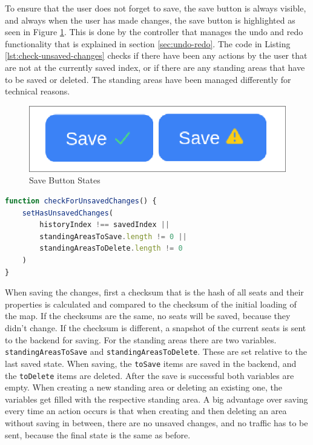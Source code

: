 To ensure that the user does not forget to save, the save button is always visible, and always when the user has made changes, the save button is highlighted as seen in Figure \ref{fig:save-button-states}. This is done by the controller that manages the undo and redo functionality that is explained in section \ref{sec:undo-redo}. The code in Listing \ref{lst:check-unsaved-changes} checks if there have been any actions by the user that are not at the currently saved index, or if there are any standing areas that have to be saved or deleted. The standing areas have been managed differently for technical reasons.

\begin{figure}
    \centering
    \includegraphics[scale=0.4]{pics/save-button-states.png}
    \caption{Save Button States}
    \label{fig:save-button-states}
\end{figure}

\begin{lstlisting}[language=TypeScript, caption=Check for Unsaved Changes, label=lst:check-unsaved-changes]
function checkForUnsavedChanges() {
    setHasUnsavedChanges(
        historyIndex !== savedIndex ||
        standingAreasToSave.length != 0 ||
        standingAreasToDelete.length != 0
    )
}
\end{lstlisting}

When saving the changes, first a checksum that is the hash of all seats and their properties is calculated and compared to the checksum of the initial loading of the map. If the checksums are the same, no seats will be saved, because they didn't change. If the checksum is different, a snapshot of the current seats is sent to the backend for saving. For the standing areas there are two variables. \texttt{standingAreasToSave} and \texttt{standingAreasToDelete}. These are set relative to the last saved state. When saving, the \texttt{toSave} items are saved in the backend, and the \texttt{toDelete} items are deleted. After the save is successful both variables are empty. When creating a new standing area or deleting an existing one, the variables get filled with the respective standing area. A big advantage over saving every time an action occurs is that when creating and then deleting an area without saving in between, there are no unsaved changes, and no traffic has to be sent, because the final state is the same as before.